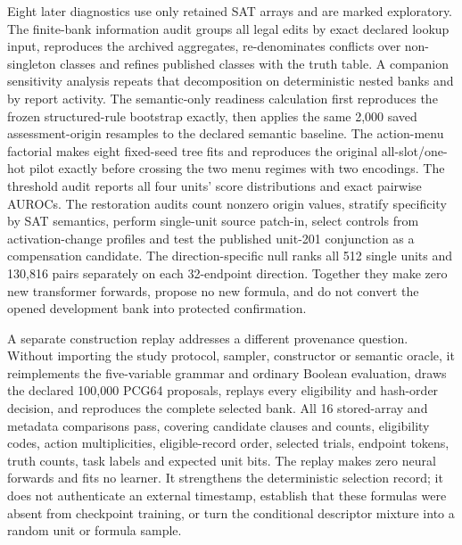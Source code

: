 \documentclass[
  british,
  11pt,
  a4paper,
]{article}
\begin{document}
Eight later diagnostics use only retained SAT arrays and are marked
exploratory. The finite-bank information audit groups all legal edits by
exact declared lookup input, reproduces the archived aggregates,
re-denominates conflicts over non-singleton classes and refines
published classes with the truth table. A companion sensitivity analysis
repeats that decomposition on deterministic nested banks and by report
activity. The semantic-only readiness calculation first reproduces the
frozen structured-rule bootstrap exactly, then applies the same 2,000
saved assessment-origin resamples to the declared semantic baseline. The
action-menu factorial makes eight fixed-seed tree fits and reproduces
the original all-slot/one-hot pilot exactly before crossing the two menu
regimes with two encodings. The threshold audit reports all four units'
score distributions and exact pairwise AUROCs. The restoration audits
count nonzero origin values, stratify specificity by SAT semantics,
perform single-unit source patch-in, select controls from
activation-change profiles and test the published unit-201 conjunction
as a compensation candidate. The direction-specific null ranks all 512
single units and 130,816 pairs separately on each 32-endpoint direction.
Together they make zero new transformer forwards, propose no new
formula, and do not convert the opened development bank into protected
confirmation.

A separate construction replay addresses a different provenance
question. Without importing the study protocol, sampler, constructor or
semantic oracle, it reimplements the five-variable grammar and ordinary
Boolean evaluation, draws the declared 100,000 PCG64 proposals, replays
every eligibility and hash-order decision, and reproduces the complete
selected bank. All 16 stored-array and metadata comparisons pass,
covering candidate clauses and counts, eligibility codes, action
multiplicities, eligible-record order, selected trials, endpoint tokens,
truth counts, task labels and expected unit bits. The replay makes zero
neural forwards and fits no learner. It strengthens the deterministic
selection record; it does not authenticate an external timestamp,
establish that these formulas were absent from checkpoint training, or
turn the conditional descriptor mixture into a random unit or formula
sample.
\end{document}
